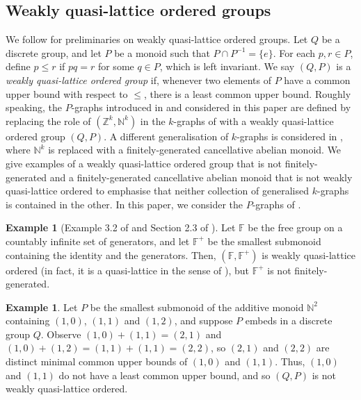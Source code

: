 \documentclass[11pt]{amsart}
\theoremstyle{definition}
\numberwithin{thm}{section}
\numberwithin{equation}{section}
\newtheorem{example}[thm]{Example}
\newcommand{\Define}[1]{\emph{#1}}
\newcommand{\Z}{\mathbb{Z}}
\newcommand{\N}{\mathbb{N}}
\begin{document}
\subsection{Weakly quasi-lattice ordered groups}
\label{sec:WQLO}

We follow \cite{aHNSY21} for preliminaries on weakly quasi-lattice ordered groups.
Let $Q$ be a discrete group, and let $P$ be a monoid such that $P \cap P^{-1} = \{e\}$. 
For each $p, r \in P$, define $p \leq r$ if $pq = r$ for some $q \in P$, which is left invariant.
We say $(Q, P)$ is a \Define{weakly quasi-lattice ordered group} if, whenever two elements of $P$ have a common upper bound with respect to $\leq$, there is a least common upper bound.
Roughly speaking, the $P$-graphs introduced in \cite{BSV13} and considered in this paper are defined by replacing the role of $(\Z^k, \N^k)$ in the $k$-graphs of \cite{KP00} with a weakly quasi-lattice ordered group $(Q, P)$. 
A different generalisation of $k$-graphs is considered in \cite{CKSS14}, where $\N^k$ is replaced with a finitely-generated cancellative abelian monoid. 
We give examples of a weakly quasi-lattice ordered group that is not finitely-generated and a finitely-generated cancellative abelian monoid that is not weakly quasi-lattice ordered to emphasise that neither collection of generalised $k$-graphs is contained in the other. 
In this paper, we consider the $P$-graphs of \cite{BSV13}.

\begin{example}[Example 3.2 of \cite{aHNSY21} and Section 2.3 of \cite{Nic92}]
Let $\mathbb{F}$ be the free group on a countably infinite set of generators, and let $\mathbb{F}^+$ be the smallest submonoid containing the identity and the generators. 
Then, $(\mathbb{F}, \mathbb{F}^+)$ is weakly quasi-lattice ordered (in fact, it is a quasi-lattice in the sense of \cite{aHNSY21}), but $\mathbb{F}^+$ is not finitely-generated.
\end{example}

\begin{example}
Let $P$ be the smallest submonoid of the additive monoid $\N^2$ containing $(1, 0)$, $(1, 1)$ and $(1, 2)$, and suppose $P$ embeds in a discrete group $Q$.
Observe $(1, 0) + (1, 1) = (2, 1)$ and $(1, 0) + (1, 2) = (1, 1) + (1, 1) = (2, 2)$, so $(2, 1)$ and $(2, 2)$ are distinct minimal common upper bounds of $(1, 0)$ and $(1, 1)$. 
Thus, $(1, 0)$ and $(1, 1)$ do not have a least common upper bound, and so $(Q, P)$ is not weakly quasi-lattice ordered.
\end{example}
\end{document}
